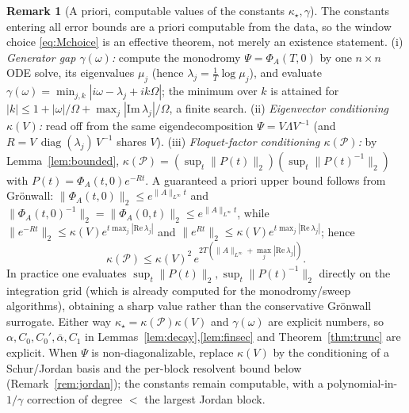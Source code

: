 \documentclass{amsart}
\theoremstyle{definition}
\newtheorem{remark}{Remark}
\DeclareMathOperator{\diag}{diag}
\begin{document}
\begin{remark}[A priori, computable values of the constants $\kappa_\star,\gamma$]
\label{rem:apriori}
The constants entering all error bounds are a priori computable from the data,
so the window choice \eqref{eq:Mchoice} is an effective theorem, not merely an
existence statement. (i) \emph{Generator gap $\gamma(\omega)$:} compute the
monodromy $\Psi=\Phi_A(T,0)$ by one $n\times n$ ODE solve, its eigenvalues
$\mu_j$ (hence $\lambda_j=\tfrac1T\log\mu_j$), and evaluate
$\gamma(\omega)=\min_{j,k}|i\omega-\lambda_j+ik\Omega|$; the minimum over $k$ is
attained for $|k|\le 1+|\omega|/\Omega+\max_j|\mathrm{Im}\,\lambda_j|/\Omega$, a
finite search. (ii) \emph{Eigenvector conditioning $\kappa(V)$:} read off from
the same eigendecomposition $\Psi=V\Lambda V^{-1}$ (and $R=V\,\diag(\lambda_j)\,V^{-1}$
shares $V$). (iii) \emph{Floquet-factor conditioning $\kappa(\mathcal P)$:} by
Lemma~\ref{lem:bounded}, $\kappa(\mathcal P)=(\sup_t\|P(t)\|_2)(\sup_t\|P(t)^{-1}\|_2)$
with $P(t)=\Phi_A(t,0)e^{-Rt}$. A guaranteed a priori upper bound follows from
Gr\"onwall: $\|\Phi_A(t,0)\|_2\le e^{\|A\|_{L^\infty}t}$ and
$\|\Phi_A(t,0)^{-1}\|_2=\|\Phi_A(0,t)\|_2\le e^{\|A\|_{L^\infty}t}$, while
$\|e^{-Rt}\|_2\le\kappa(V)e^{t\max_j|\mathrm{Re}\,\lambda_j|}$ and
$\|e^{Rt}\|_2\le\kappa(V)e^{t\max_j|\mathrm{Re}\,\lambda_j|}$; hence
\[
\kappa(\mathcal P)\le \kappa(V)^2\,e^{2T(\|A\|_{L^\infty}+\max_j|\mathrm{Re}\,\lambda_j|)} .
\]
In practice one evaluates $\sup_t\|P(t)\|_2,\sup_t\|P(t)^{-1}\|_2$ directly on the
integration grid (which is already computed for the monodromy/sweep algorithms),
obtaining a sharp value rather than the conservative Gr\"onwall surrogate. Either
way $\kappa_\star=\kappa(\mathcal P)\kappa(V)$ and $\gamma(\omega)$ are explicit
numbers, so $\alpha,C_0,C_0',\bar\alpha,C_1$ in
Lemmas~\ref{lem:decay},\ref{lem:finsec} and Theorem~\ref{thm:trunc} are explicit.
When $\Psi$ is non-diagonalizable, replace $\kappa(V)$ by the conditioning of a
Schur/Jordan basis and the per-block resolvent bound below
(Remark~\ref{rem:jordan}); the constants remain computable, with a
polynomial-in-$1/\gamma$ correction of degree $<$ the largest Jordan block.
\end{remark}
\end{document}
